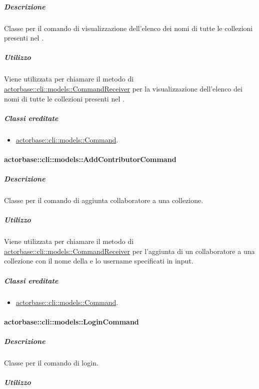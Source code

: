 \documentclass{scalatekids-article}
\begin{document}
\subparagraph{Descrizione}

Classe per il comando di visualizzazione dell'elenco dei nomi di tutte le
collezioni presenti nel .

\subparagraph{Utilizzo}

Viene utilizzata per chiamare il metodo di
\hyperref[sec:actorbase::cli::models::CommandReceiver]{actorbase::cli::models::CommandReceiver} per la visualizzazione dell'elenco dei
nomi di tutte le collezioni presenti nel .

\subparagraph{Classi ereditate}

\begin{itemize}
\item \hyperref[sec:actorbase::cli::models::Command]{actorbase::cli::models::Command}.
\end{itemize}

\paragraph{actorbase::cli::models::AddContributorCommand}
\label{sec:actorbase::cli::models::AddContributorCommand}

\subparagraph{Descrizione}

Classe per il comando di aggiunta collaboratore a una collezione.

\subparagraph{Utilizzo}

Viene utilizzata per chiamare il metodo di
\hyperref[sec:actorbase::cli::models::CommandReceiver]{actorbase::cli::models::CommandReceiver} per l'aggiunta di un collaboratore a
una collezione con il nome della  e lo username specificati
in input.

\subparagraph{Classi ereditate}

\begin{itemize}
\item \hyperref[sec:actorbase::cli::models::Command]{actorbase::cli::models::Command}.
\end{itemize}

\paragraph{actorbase::cli::models::LoginCommand}
\label{sec:actorbase::cli::models::LoginCommand}

\subparagraph{Descrizione}

Classe per il comando di login.

\subparagraph{Utilizzo}
\end{document}
